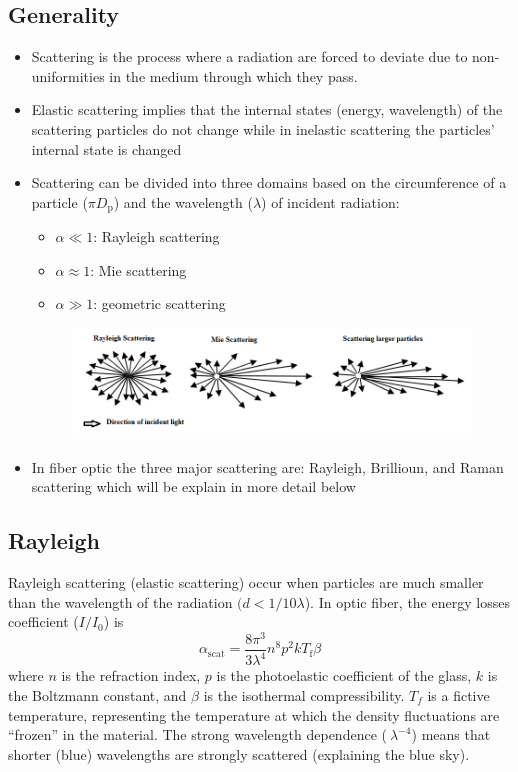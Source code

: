 \documentclass[twocolumn]{article}
\numberwithin{equation}{section}
\begin{document}
	\subsection{Generality}
\begin{itemize}
	\item Scattering is the process where a radiation are forced to deviate due to non-uniformities in the medium through which they pass.
	\item Elastic scattering implies that the internal states (energy, wavelength) of the scattering particles do not change while in inelastic scattering the particles' internal state is changed
	\item Scattering can be divided into three domains based on the circumference of a particle ($\pi D_\text{p}$) and the wavelength ($\lambda$) of incident radiation:
	\begin{itemize}
		\item $\alpha \ll 1$: Rayleigh scattering
		\item $\alpha \approx 1$: Mie scattering
		\item $\alpha \gg 1$: geometric scattering
	\end{itemize}
	\begin{figure}[H]
	\centering
	\includegraphics[width=.5\textwidth]{image11.png}
\end{figure}	
	\item In fiber optic the three major scattering are: Rayleigh, Brillioun, and Raman scattering which will be explain in more detail below
\end{itemize}


	\subsection{Rayleigh}
Rayleigh scattering (elastic scattering) occur when particles are much smaller than the wavelength of the radiation $(d < 1 /10 \lambda$). In optic fiber, the energy losses coefficient ($I/I_0$) is 
$$\alpha_\text{scat} = \frac{8 \pi^3}{3 \lambda^4} n^8 p^2 k T_\text{f} \beta$$
where $n$ is the refraction index, $p$ is the photoelastic coefficient of the glass, $k$ is the Boltzmann constant, and $\beta$ is the isothermal compressibility. $T_f$ is a fictive temperature, representing the temperature at which the density fluctuations are ``frozen'' in the material. The strong wavelength dependence ($~\lambda^{−4}$) means that shorter (blue) wavelengths are strongly scattered (explaining the blue sky).
\end{document}
